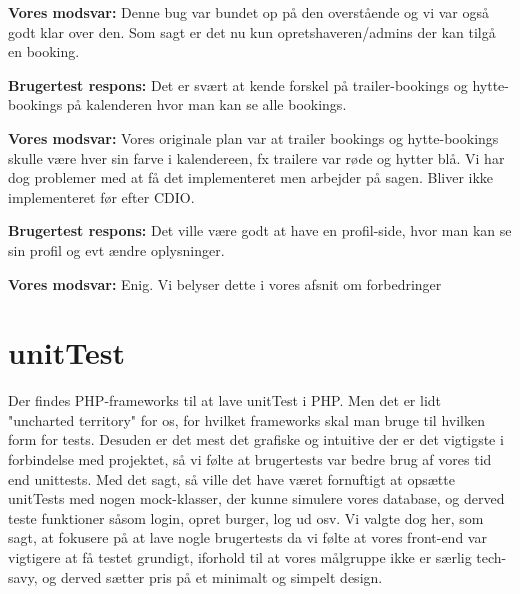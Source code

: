 \documentclass[12pt,a4paper]{report} %
\begin{document}
\noindent\textbf{Vores modsvar:} Denne bug var bundet op på den overstående og vi var også godt klar over den. Som sagt er det nu kun opretshaveren/admins der kan tilgå en booking.

\noindent\textbf{Brugertest respons:} Det er svært at kende forskel på trailer-bookings og hytte-bookings på kalenderen hvor man kan se alle bookings.

\noindent\textbf{Vores modsvar:} Vores originale plan var at trailer bookings og hytte-bookings skulle være hver sin farve i kalendereen, fx trailere var røde og hytter blå. Vi har dog problemer med at få det implementeret men arbejder på sagen. Bliver ikke implementeret før efter CDIO.

\noindent\textbf{Brugertest respons:} Det ville være godt at have en profil-side, hvor man kan se sin profil og evt ændre oplysninger.

\noindent\textbf{Vores modsvar:} Enig. Vi belyser dette i vores afsnit om forbedringer

    \section{unitTest}
    Der findes PHP-frameworks til at lave unitTest i PHP. Men det er lidt "uncharted territory" for os, for hvilket frameworks skal man bruge til hvilken form for tests. Desuden er det mest det grafiske og intuitive der er det vigtigste i forbindelse med projektet, så vi følte at brugertests var bedre brug af vores tid end unittests.
    \newline Med det sagt, så ville det have været fornuftigt at opsætte unitTests med nogen mock-klasser, der kunne simulere vores database, og derved teste funktioner såsom login, opret burger, log ud osv. Vi valgte dog her, som sagt, at fokusere på at lave nogle brugertests da vi følte at vores front-end var vigtigere at få testet grundigt, iforhold til at vores målgruppe ikke er særlig tech-savy, og derved sætter pris på et minimalt og simpelt design. 

    
    
\end{document}
